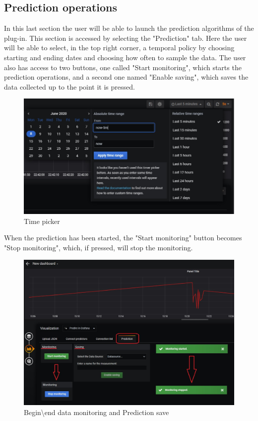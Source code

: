 \subsection{Prediction operations}
In this last section the user will be able to launch the prediction algorithms of the plug-in. This section is accessed by selecting the "Prediction" tab. Here the user will be able to select, in the top right corner, a temporal policy by choosing starting and ending dates and choosing how often to sample the data. The user  also has access to two buttons, one called "Start monitoring", which starts the prediction operations, and a second one named "Enable saving", which saves the data collected up to the point it is pressed.\\

\begin{figure}[H]
\centering
\includegraphics[scale=0.70]{img/plug-in/time_selector.png}
\caption{Time picker}
\end{figure}

When the prediction has been started, the "Start monitoring" button becomes "Stop monitoring", which, if pressed, will stop the monitoring.

\begin{figure}[H]
\centering
\includegraphics[scale=0.65]{img/plug-in/plugin_7.JPG}
\caption{Begin\textbackslash end data monitoring and Prediction save}

\end{figure} 
 

